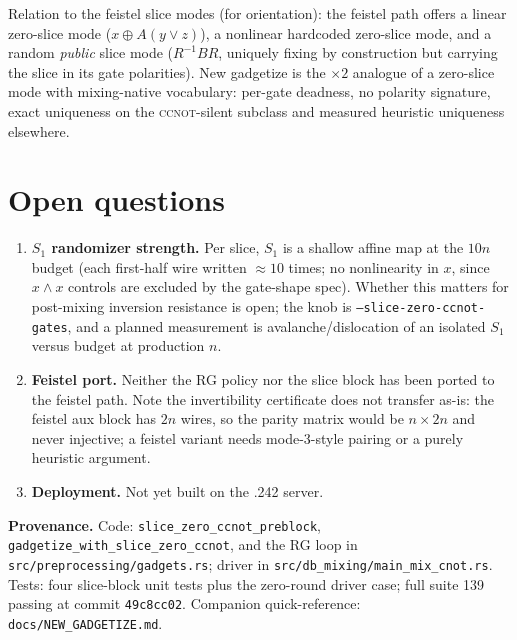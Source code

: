 \documentclass[11pt]{article}
\newcommand{\CCNOT}{\textsc{ccnot}}
\newcommand{\code}[1]{\texttt{#1}}
\newcommand{\Sone}{S_1}
\begin{document}
Relation to the feistel slice modes (for orientation): the feistel path
offers a linear zero-slice mode ($x \oplus A(y{\lor}z)$), a nonlinear
hardcoded zero-slice mode, and a random \emph{public} slice mode
($R^{-1}BR$, uniquely fixing by construction but carrying the slice in its
gate polarities). New gadgetize is the $\times 2$ analogue of a zero-slice
mode with mixing-native vocabulary: per-gate deadness, no polarity
signature, exact uniqueness on the \CCNOT{}-silent subclass and measured
heuristic uniqueness elsewhere.

\section{Open questions}

\begin{enumerate}
\item \textbf{$\Sone$ randomizer strength.} Per slice, $\Sone$ is a shallow
affine map at the $10n$ budget (each first-half wire written $\approx 10$
times; no nonlinearity in $x$, since $x{\wedge}x$ controls are excluded by
the gate-shape spec). Whether this matters for post-mixing inversion
resistance is open; the knob is \code{--slice-zero-ccnot-gates}, and a
planned measurement is avalanche/dislocation of an isolated $\Sone$ versus
budget at production $n$.
\item \textbf{Feistel port.} Neither the RG policy nor the slice block has
been ported to the feistel path. Note the invertibility certificate does
not transfer as-is: the feistel aux block has $2n$ wires, so the parity
matrix would be $n \times 2n$ and never injective; a feistel variant needs
mode-3-style pairing or a purely heuristic argument.
\item \textbf{Deployment.} Not yet built on the .242 server.
\end{enumerate}

\vspace{6pt}
\noindent\textbf{Provenance.} Code: \code{slice\_zero\_ccnot\_preblock},
\code{gadgetize\_with\_slice\_zero\_ccnot}, and the RG loop in
\code{src/preprocessing/gadgets.rs}; driver in
\code{src/db\_mixing/main\_mix\_cnot.rs}. Tests: four slice-block unit tests
plus the zero-round driver case; full suite 139 passing at commit
\code{49c8cc02}. Companion quick-reference: \code{docs/NEW\_GADGETIZE.md}.
\end{document}
